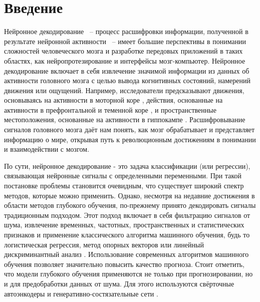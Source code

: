 \documentclass[a4paper, 12pt]{article}
\begin{document}
	\newpage
	
	\section{Введение}
	
	Нейронное декодирование ~-- процесс расшифровки информации, полученной в результате нейронной активности ~-- имеет большие перспективы в понимании сложностей человеческого мозга и разработке передовых приложений в таких областях, как нейропротезирование и интерфейсы мозг-компьютер.
	Нейронное декодирование включает в себя извлечение значимой информации из данных об активности головного мозга с целью вывода когнитивных состояний, намерений движения или ощущений.
	Например, исследователи предсказывают движения, основываясь на активности в моторной коре \citep{temp_ethier2012restoration}, действия, основанные на активности в префронтальной и теменной коре \citep{temp_ibos2017sequential}, и пространственные местоположения, основанные на активности в гиппокампе \citep{temp_davidson2009hippocampal}. 
	Расшифровывание сигналов головного мозга даёт нам понять, как мозг обрабатывает и представляет информацию о мире, открывая путь к революционным достижениям в понимании и взаимодействии с мозгом.

	По сути, нейронное декодирование - это задача классификации (или регрессии), связывающая нейронные сигналы с определенными переменными. 
	При такой постановке проблемы становится очевидным, что существует широкий спектр методов, которые можно применить. 
	Однако, несмотря на недавние достижения в области методов глубокого обучения, по-прежнему принято декодировать сигналы традиционным подходом.
	Этот подход включает в себя фильтрацию сигналов от шума, извлечение временных, частотных, пространственных и статистических признаков и применение классического алгоритма машинного обучения, будь то логистическая регрессия, метод опорных векторов или линейный дискриминантный анализ \citep{firuzi2022decoding}.
	Использование современных алгоритмов машинного обучения позволяет значительно повысить качество прогноза.
	Стоит отметить, что модели глубокого обучения применяются не только при прогнозировании, но и для предобработки данных от шума.
	Для этого используются свёрточные автоэнкодеры \citep{temp_leite2018deep, temp_caldas2020towards} и генеративно-состязательные сети \citep{temp_an2022auto}.
	
\end{document}

